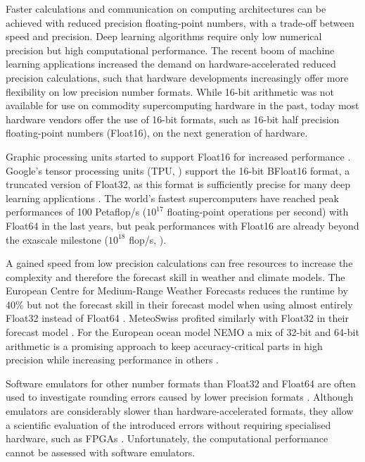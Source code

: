 \documentclass[draft]{agujournal2019}
\begin{document}
Faster calculations and communication on computing architectures can be achieved
with reduced precision floating-point numbers, with a trade-off between speed
and precision. Deep learning algorithms require only low numerical precision but
high computational performance. The recent boom of machine learning applications
increased the demand on hardware-accelerated reduced precision calculations,
such that hardware developments increasingly offer more flexibility on
low precision number formats. While 16-bit arithmetic was not available for use
on commodity supercomputing hardware in the past, today most hardware vendors
offer the use of 16-bit formats, such as 16-bit half precision floating-point
numbers (Float16), on the next generation of hardware.

Graphic processing units started to support Float16 for increased performance
\cite{Markidis2018}. Google's tensor processing units (TPU, )
support the 16-bit BFloat16 format, a truncated version of Float32\add{)}, as this format is sufficiently precise for many deep learning
applications \cite{Kalamkar2019,Burgess2019,Gupta2015}. The world's fastest
supercomputers have reached peak performances of 100 Petaflop/s ($10^{17}$
floating-point operations per second) with Float64 in the last years, but peak
performances with Float16 are already beyond the exascale milestone
($10^{18}$ flop/s, ).

A gained speed from low precision calculations can free resources
to increase the complexity and therefore the forecast skill in weather and climate models.
The European Centre for Medium-Range Weather Forecasts reduces the runtime by
40\% but not the forecast skill in their forecast model when using almost entirely
Float32\remove{)} instead of Float64 \cite{Vana2017}. MeteoSwiss
profited similarly with Float32 in their forecast model \cite{Rudisuhli2013}. For
the European ocean model NEMO a mix of 32-bit and 64-bit arithmetic is a promising
approach to keep accuracy-critical parts in high precision while increasing
performance in others \cite{TintoPrims2019}.

Software emulators for other number formats than Float32 and Float64 are often
used to investigate rounding errors caused by lower precision formats \cite{Dawson2017}.
Although emulators are considerably slower than hardware-accelerated formats,
they allow a scientific evaluation of the introduced errors without requiring
specialised hardware, such as FPGAs \cite{Russell2017}. Unfortunately, the
computational performance cannot be assessed with software emulators.
\end{document}
